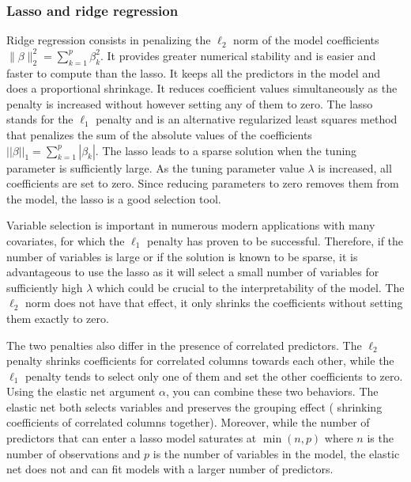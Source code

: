 \subsubsection{Lasso and ridge regression}

Ridge regression consists in penalizing the $\ell_2$ norm of the model coefficients $\| \beta \|_2^2=\sum_{k=1}^p \beta_k^2$. It provides greater numerical stability and is easier and faster to compute than the lasso. It keeps all the predictors in the model and does a proportional shrinkage. It reduces coefficient values simultaneously as the penalty is increased without however setting any of them to zero. The lasso stands for the $\ell_1$ penalty and is an alternative regularized least squares method that penalizes the sum of the absolute values of the coefficients 
$||\beta||_1=\sum_{k=1}^p |\beta_k|$. The lasso leads to a sparse solution when the tuning parameter is sufficiently large. As the tuning parameter value $\lambda$ is increased, all coefficients are set to zero. Since reducing
parameters to zero removes them from the model, the lasso is a good selection tool. 


Variable selection is important in numerous modern applications with many covariates, for which the $\ell_1$ penalty has proven to be successful. Therefore, if the number of variables is large or if the solution is known to be sparse, it is advantageous to use the lasso as it will select a small number of variables for sufficiently high $\lambda$ which could be crucial to the interpretability of the model. The $\ell_2$ norm does not have that effect, it only shrinks the coefficients without setting them exactly to zero.  %

The two penalties also differ in the presence of correlated
predictors. The $\ell_2$ penalty shrinks coefficients for correlated columns towards each other, while the $\ell_1$ penalty
tends to select only one of them and set the other coefficients to zero. Using the elastic net argument $\alpha$, you can combine these two
behaviors. The elastic net both selects variables and preserves the grouping effect ( shrinking coefficients of correlated columns together). Moreover, while the number of predictors that can enter a lasso model saturates at $\min(n,p)$ where $n$ is the number of observations and $p$ is the number of variables in the model, the elastic net does not and can fit models with a larger number of predictors. %

